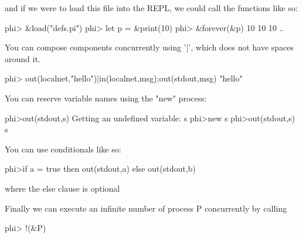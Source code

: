 and if we were to load this file into the REPL, we could call the functions like so:
\begin{code}
    phi> &load("defs.pi")
    phi> let p = &print(10)
    phi> &forever(&p)
    10
    10
    10
    ..
\end{code}

You can compose components concurrently using '|', which does not have spaces around it.
\begin{code}
    phi> out(localnet,"hello")|in(localnet,msg);out(stdout,msg)
    "hello"
\end{code}

You can reserve variable names using the "new" process:
\begin{code}
    phi>out(stdout,s)
    Getting an undefined variable: s
    phi>new s
    phi>out(stdout,s)
    s
\end{code}

You can use conditionals like so:
\begin{code}
    phi>if a = true then out(stdout,a) else out(stdout,b)
\end{code}
where the else clause is optional

Finally we can execute an infinite number of process P concurrently by calling 
\begin{code}
    phi> !(&P)
\end{code}
